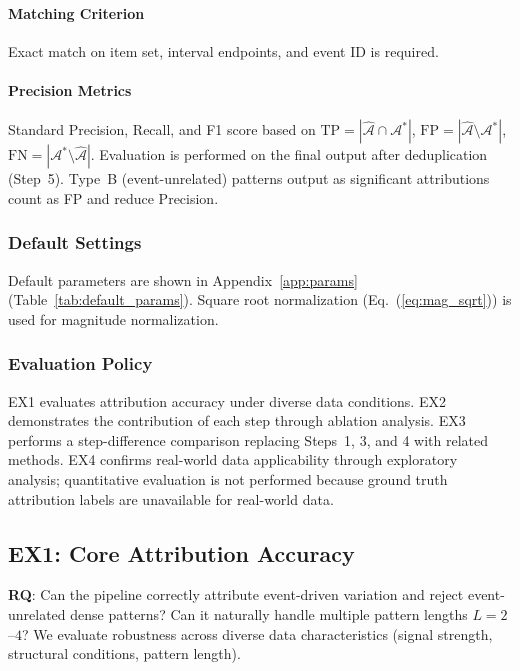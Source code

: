 \paragraph{Matching Criterion}
Exact match on item set, interval endpoints, and event ID is required.

\paragraph{Precision Metrics}
Standard Precision, Recall, and F1 score based on
$\text{TP} = |\hat{\mathcal{A}} \cap \mathcal{A}^*|$,
$\text{FP} = |\hat{\mathcal{A}} \setminus \mathcal{A}^*|$,
$\text{FN} = |\mathcal{A}^* \setminus \hat{\mathcal{A}}|$.
Evaluation is performed on the final output after deduplication (Step~5).
Type~B (event-unrelated) patterns output as significant attributions
count as FP and reduce Precision.

\subsubsection{Default Settings}

Default parameters are shown in Appendix~\ref{app:params} (Table~\ref{tab:default_params}).
Square root normalization (Eq.~(\ref{eq:mag_sqrt})) is used for magnitude normalization.

\subsubsection{Evaluation Policy}

EX1 evaluates attribution accuracy under diverse data conditions.
EX2 demonstrates the contribution of each step through ablation analysis.
EX3 performs a step-difference comparison replacing Steps~1, 3, and 4 with related methods.
EX4 confirms real-world data applicability through exploratory analysis;
quantitative evaluation is not performed because ground truth attribution labels
are unavailable for real-world data.

\subsection{EX1: Core Attribution Accuracy}
\label{sec:exp_ex1}

\textbf{RQ}: Can the pipeline correctly attribute event-driven variation
and reject event-unrelated dense patterns?
Can it naturally handle multiple pattern lengths $L = 2$--$4$?
We evaluate robustness across diverse data characteristics
(signal strength, structural conditions, pattern length).

